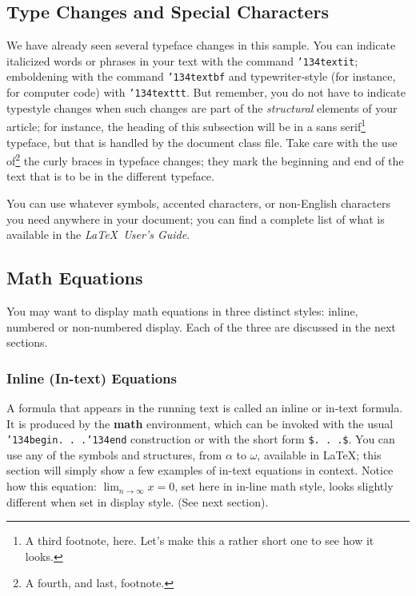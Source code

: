\documentclass{sig-alternate}
\begin{document}
\subsection{Type Changes and {\subsecit Special} Characters}
We have already seen several typeface changes in this sample.  You
can indicate italicized words or phrases in your text with
the command \texttt{{\char'134}textit}; emboldening with the
command \texttt{{\char'134}textbf}
and typewriter-style (for instance, for computer code) with
\texttt{{\char'134}texttt}.  But remember, you do not
have to indicate typestyle changes when such changes are
part of the \textit{structural} elements of your
article; for instance, the heading of this subsection will
be in a sans serif\footnote{A third footnote, here.
Let's make this a rather short one to
see how it looks.} typeface, but that is handled by the
document class file. Take care with the use
of\footnote{A fourth, and last, footnote.}
the curly braces in typeface changes; they mark
the beginning and end of
the text that is to be in the different typeface.

You can use whatever symbols, accented characters, or
non-English characters you need anywhere in your document;
you can find a complete list of what is
available in the \textit{\LaTeX\
User's Guide}\cite{Lamport:LaTeX}.

\subsection{Math Equations}
You may want to display math equations in three distinct styles:
inline, numbered or non-numbered display.  Each of
the three are discussed in the next sections.

\subsubsection{Inline (In-text) Equations}
A formula that appears in the running text is called an
inline or in-text formula.  It is produced by the
\textbf{math} environment, which can be
invoked with the usual \texttt{{\char'134}begin. . .{\char'134}end}
construction or with the short form \texttt{\$. . .\$}. You
can use any of the symbols and structures,
from $\alpha$ to $\omega$, available in
\LaTeX\cite{Lamport:LaTeX}; this section will simply show a
few examples of in-text equations in context. Notice how
this equation: \begin{math}\lim_{n\rightarrow \infty}x=0\end{math},
set here in in-line math style, looks slightly different when
set in display style.  (See next section).
\end{document}
